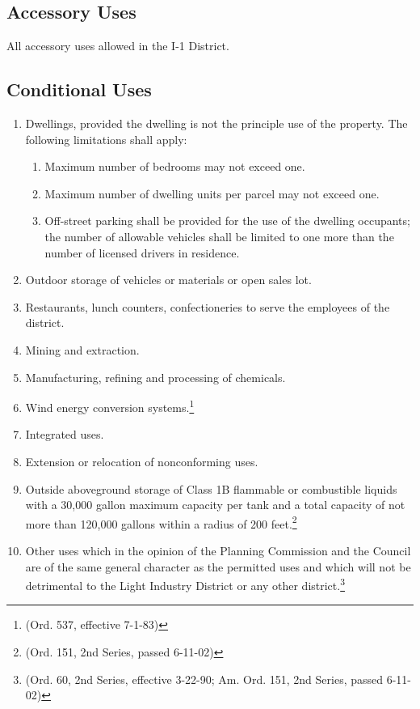 \subsection{Accessory Uses}
All accessory uses allowed in the I-1 District.
\subsection{Conditional Uses}
\begin{enumerate}[{\indent}1)]
    \item Dwellings, provided the dwelling is not the principle use of the property. The following limitations shall apply:
        \begin{enumerate}
            \item Maximum number of bedrooms may not exceed one.
            \item Maximum number of dwelling units per parcel may not exceed one.
            \item Off-street parking shall be provided for the use of the dwelling occupants; the number of allowable vehicles shall be limited to one more than the number of licensed drivers in residence.
        \end{enumerate}
    \item Outdoor storage of vehicles or materials or open sales lot.
    \item Restaurants, lunch counters, confectioneries to serve the employees of the district.
    \item Mining and extraction.
    \item Manufacturing, refining and processing of chemicals.
    \item Wind energy conversion systems.\footnote{(Ord. 537, effective 7-1-83)}
    \item Integrated uses.
    \item Extension or relocation of nonconforming uses.
    \item  Outside aboveground storage of Class 1B flammable or combustible liquids with a 30,000 gallon maximum capacity per tank and a total capacity of not more than 120,000 gallons within a radius of 200 feet.\footnote{(Ord. 151, 2nd Series, passed 6-11-02)}
    \item Other uses which in the opinion of the Planning Commission and the Council are of the same general character as the permitted uses and which will not be detrimental to the Light Industry District or any other district.\footnote{(Ord. 60, 2nd Series, effective 3-22-90; Am. Ord. 151, 2nd Series, passed 6-11-02)}
\end{enumerate}

